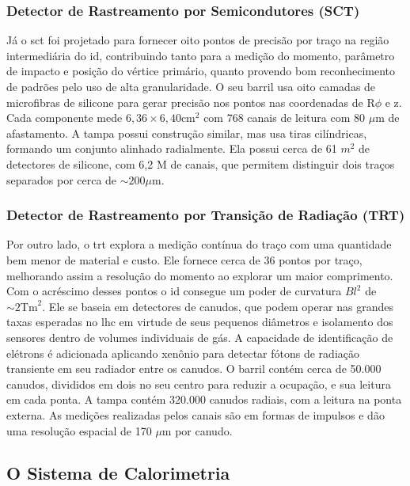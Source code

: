 \subsubsection{Detector de Rastreamento por Semicondutores (SCT)}
\label{sssec:sct}

Já o \gls{sct} foi projetado para fornecer oito pontos de precisão por traço na
região intermediária do \gls{id}, contribuindo tanto para a medição do momento,
parâmetro de impacto e posição do vértice primário, quanto provendo bom
reconhecimento de padrões pelo uso de alta granularidade. O seu barril usa oito
camadas de microfibras de silicone para gerar precisão nos pontos nas
coordenadas de R$\phi$ e z. Cada componente mede $6,36\times6,40 \text{cm}^2$ com 768 canais de
leitura com 80 $\mu$m de afastamento. A tampa possui construção similar, mas usa
tiras cilíndricas, formando um conjunto alinhado radialmente. Ela possui cerca de 61
$m^2$ de detectores de silicone, com 6,2 M de canais, que permitem distinguir
dois traços separados por cerca de $\sim200 \mu$m.

\subsubsection{Detector de Rastreamento por Transição de Radiação (TRT)}
\label{sssec:trt}

Por outro lado, o \gls{trt} explora a medição contínua do traço com uma
quantidade bem menor de material e custo. Ele fornece cerca de 36 pontos por
traço, melhorando assim a resolução do momento ao explorar um maior
\gls{comprimento}. Com o acréscimo desses pontos o \gls{id} consegue 
um poder de curvatura $Bl^2$ de $\sim2\text{Tm}^2$. 
Ele se baseia em detectores de canudos, que podem operar nas
grandes taxas esperadas no \gls{lhc} em virtude de seus pequenos diâmetros e
isolamento dos sensores dentro de volumes individuais de gás. A capacidade de
identificação de elétrons é adicionada aplicando xenônio para detectar fótons de
radiação transiente em seu radiador entre os canudos. O barril contém cerca de
50.000 canudos, divididos em dois no seu centro para reduzir a ocupação, e sua
leitura em cada ponta. A tampa contém 320.000 canudos radiais, com a leitura na
ponta externa. As medições realizadas pelos canais são em formas de
impulsos e dão uma resolução espacial de 170 $\mu$m por canudo.


\subsection{O Sistema de Calorimetria}
\label{ssec:calorimetria}

